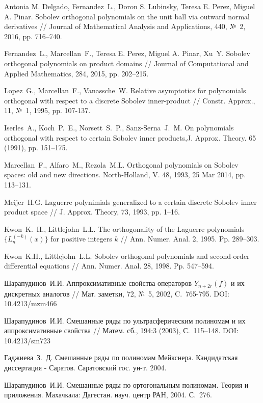 Antonia M. Delgado, Fernandez~L., Doron S. Lubinsky, Teresa E. Perez, Miguel A. Pinar. Sobolev orthogonal polynomials on the unit ball via outward normal derivatives // Journal of Mathematical Analysis and Applications, 440, №~2, 2016, pp. 716–740.

Fernandez~L., Marcellan~F., Teresa E. Perez, Miguel A. Pinar, Xu~Y. Sobolev orthogonal polynomials on product domains // Journal of Computational and Applied Mathematics, 284, 2015, pp. 202–215.

Lopez~G., Marcellan~F., Vanassche~W. Relative asymptotics for polynomials orthogonal with respect to a discrete Sobolev inner-product // Constr. Approx., 11, №~1, 1995, pp. 107-137.

Iserles~A., Koch~P.~E., Norsett~S.~P., Sanz-Serna~J.~M. On polynomials  orthogonal  with respect  to certain Sobolev inner products,J. Approx. Theory. 65 (1991), pp. 151--175.

Marcellan~F., Alfaro~M., Rezola~M.L. Orthogonal polynomials on Sobolev spaces: old and new directions. North-Holland, V. 48, 1993, 25 Mar 2014, pp. 113--131.

Meijer~H.G. Laguerre polynimials generalized to a certain discrete Sobolev inner product space // J. Approx. Theory, 73, 1993, pp. 1--16.

Kwon~K.~H., Littlejohn~L.L. The orthogonality of the Laguerre polynomials $\{L_n^{(-k)}(x)\}$ for positive integers $k$ // Ann. Numer. Anal. 2, 1995. Pp. 289--303.

Kwon~K.H., Littlejohn~L.L.  Sobolev orthogonal polynomials and second-order differential equations // Ann. Numer. Anal. 28, 1998. Pp. 547--594.

Шарапудинов~И.И. Аппроксимативные свойства операторов $Y_{n+2r}(f)$ и их дискретных аналогов // Мат. заметки, 72, №~5, 2002, C.~765-795. DOI: 10.4213/mzm466

Шарапудинов~И.И. Смешанные ряды по ультрасферическим полиномам и их аппроксимативные свойства // Матем. сб., 194:3 (2003), С.~115--148. DOI: 10.4213/sm723

Гаджиева~З.~Д. Смешанные ряды по полиномам Мейкснера. Кандидатская диссертация - Саратов. Саратовский гос. ун-т. 2004.

Шарапудинов~И.И. Смешанные ряды по ортогональным полиномам. Теория и приложения. Махачкала: Дагестан. науч. центр РАН, 2004. С.~276.

